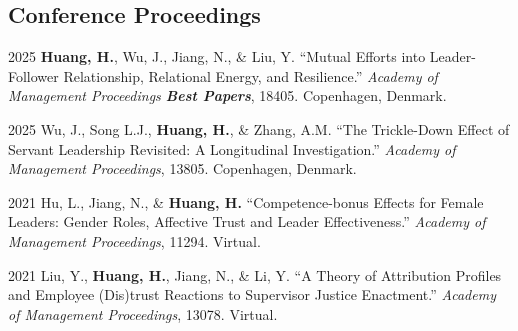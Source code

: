 \documentclass[11pt,letterpaper]{report} %
\begin{document}






    \subsection*{Conference Proceedings}

    \begin{tablist}

        \item[2025] \tab{}\textbf{Huang, H.}, Wu, J., Jiang, N., \& Liu, Y. \enquote{Mutual Efforts into Leader-Follower Relationship, Relational Energy, and Resilience.} \textit{Academy of Management Proceedings \textbf{Best Papers}}, 18405. Copenhagen, Denmark.

        \item[2025] \tab{}Wu, J., Song L.J., \textbf{Huang, H.}, \& Zhang, A.M. \enquote{The Trickle-Down Effect of Servant Leadership Revisited: A Longitudinal Investigation.} \textit{Academy of Management Proceedings}, 13805. Copenhagen, Denmark.

        \item[2021] \tab{}Hu, L., Jiang, N., \& \textbf{Huang, H.} \enquote{Competence-bonus Effects for Female Leaders: Gender Roles, Affective Trust and Leader Effectiveness.} \textit{Academy of Management Proceedings}, 11294. Virtual.

        \item[2021] \tab{}Liu, Y., \textbf{Huang, H.}, Jiang, N., \& Li, Y. \enquote{A Theory of Attribution Profiles and Employee (Dis)trust Reactions to Supervisor Justice Enactment.} \textit{Academy of Management Proceedings}, 13078. Virtual.


    \end{tablist}
\end{document}

